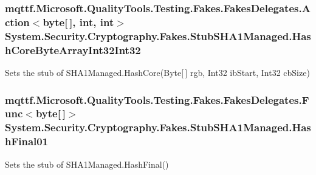 \hypertarget{class_system_1_1_security_1_1_cryptography_1_1_fakes_1_1_stub_s_h_a1_managed_ad26495b84f5f77ced83a522d85b97c03}{
\subsubsection[{Hash\-Core\-Byte\-Array\-Int32\-Int32}]{\setlength{\rightskip}{0pt plus 5cm}mqttf.\-Microsoft.\-Quality\-Tools.\-Testing.\-Fakes.\-Fakes\-Delegates.\-Action$<$byte\mbox{[}$\,$\mbox{]}, int, int$>$ System.\-Security.\-Cryptography.\-Fakes.\-Stub\-S\-H\-A1\-Managed.\-Hash\-Core\-Byte\-Array\-Int32\-Int32}}\label{class_system_1_1_security_1_1_cryptography_1_1_fakes_1_1_stub_s_h_a1_managed_ad26495b84f5f77ced83a522d85b97c03}


Sets the stub of S\-H\-A1\-Managed.\-Hash\-Core(\-Byte\mbox{[}$\,$\mbox{]} rgb, Int32 ib\-Start, Int32 cb\-Size)

\hypertarget{class_system_1_1_security_1_1_cryptography_1_1_fakes_1_1_stub_s_h_a1_managed_a4ba3d8712ccf9f2b05d29ae6e5a97266}{
\subsubsection[{Hash\-Final01}]{\setlength{\rightskip}{0pt plus 5cm}mqttf.\-Microsoft.\-Quality\-Tools.\-Testing.\-Fakes.\-Fakes\-Delegates.\-Func$<$byte\mbox{[}$\,$\mbox{]}$>$ System.\-Security.\-Cryptography.\-Fakes.\-Stub\-S\-H\-A1\-Managed.\-Hash\-Final01}}\label{class_system_1_1_security_1_1_cryptography_1_1_fakes_1_1_stub_s_h_a1_managed_a4ba3d8712ccf9f2b05d29ae6e5a97266}


Sets the stub of S\-H\-A1\-Managed.\-Hash\-Final()

